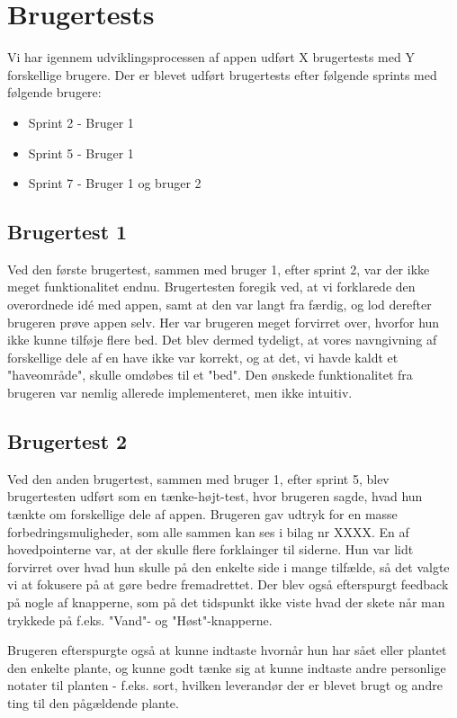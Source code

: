 \section{Brugertests}
Vi har igennem udviklingsprocessen af appen udført X brugertests med Y forskellige brugere. Der er blevet udført brugertests efter følgende sprints med følgende brugere:
\begin{itemize}
    \item Sprint 2 - Bruger 1
    \item Sprint 5 - Bruger 1
    \item Sprint 7 - Bruger 1 og bruger 2
\end{itemize}

\subsection{Brugertest 1}
Ved den første brugertest, sammen med bruger 1, efter sprint 2, var der ikke meget funktionalitet endnu. Brugertesten foregik ved, at vi forklarede den overordnede idé med appen, samt at den var langt fra færdig, og lod derefter brugeren prøve appen selv. Her var brugeren meget forvirret over, hvorfor hun ikke kunne tilføje flere bed. Det blev dermed tydeligt, at vores navngivning af forskellige dele af en have ikke var korrekt, og at det, vi havde kaldt et "haveområde", skulle omdøbes til et "bed". Den ønskede funktionalitet fra brugeren var nemlig allerede implementeret, men ikke intuitiv.

\subsection{Brugertest 2}

Ved den anden brugertest, sammen med bruger 1, efter sprint 5, blev brugertesten udført som en tænke-højt-test, hvor brugeren sagde, hvad hun tænkte om forskellige dele af appen.
Brugeren gav udtryk for en masse forbedringsmuligheder, som alle sammen kan ses i bilag nr XXXX. En af hovedpointerne var, at der skulle flere forklainger til siderne. Hun var lidt forvirret over hvad hun skulle på den enkelte side i mange tilfælde, så det valgte vi at fokusere på at gøre bedre fremadrettet.
Der blev også efterspurgt feedback på nogle af knapperne, som på det tidspunkt ikke viste hvad der skete når man trykkede på f.eks. "Vand"- og "Høst"-knapperne.

Brugeren efterspurgte også at kunne indtaste hvornår hun har sået eller plantet den enkelte plante, og kunne godt tænke sig at kunne indtaste andre personlige notater til planten - f.eks. sort, hvilken leverandør der er blevet brugt og andre ting til den pågældende plante.

